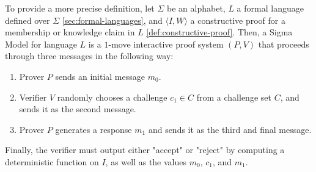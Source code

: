 To provide a more precise definition, let $\Sigma$ be an alphabet, $L$ a formal language defined over $\Sigma$ \ref{sec:formal-languages}, and $\langle I, W\rangle$ a constructive proof for a membership or knowledge claim in $L$ \ref{def:constructive-proof}. Then, a Sigma Model for language $L$ is a $1$-move interactive proof system $(P,V)$ that proceeds through three messages in the following way:
\begin{enumerate}
\label{def_sigma-model}
\item Prover $P$ sends an initial message $m_0$.
\item Verifier $V$ randomly chooses a challenge $c_1\in C$ from a challenge set $C$, and sends it as the second message.
\item Prover $P$ generates a response $m_1$ and sends it as the third and final message.
\end{enumerate}
Finally, the verifier must output either "accept" or "reject" by computing a deterministic function on $I$, as well as the values $m_0$, $c_1$, and $m_1$.
